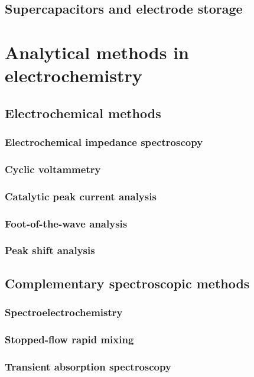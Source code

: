 \documentclass{article}
\numberwithin{theorem}{section}
\numberwithin{corollary}{section}
\numberwithin{postulate}{section}
\numberwithin{lemma}{section}
\numberwithin{definition}{section}
\begin{document}
\subsection{Supercapacitors and electrode storage}

\section{Analytical methods in electrochemistry}

\subsection{Electrochemical methods}

\subsubsection{Electrochemical impedance spectroscopy}

\subsubsection{Cyclic voltammetry}

\subsubsection{Catalytic peak current analysis}

\subsubsection{Foot-of-the-wave analysis}

\subsubsection{Peak shift analysis}

\subsection{Complementary spectroscopic methods}

\subsubsection{Spectroelectrochemistry}

\subsubsection{Stopped-flow rapid mixing}

\subsubsection{Transient absorption spectroscopy}
\end{document}
